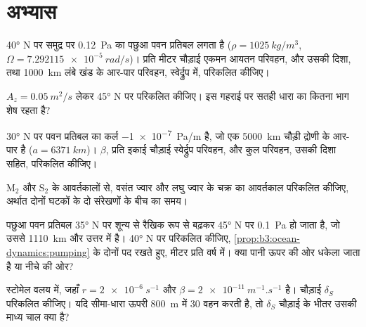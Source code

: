 \section{अभ्यास}

\begin{exercise}[$\star$]\label{exo:b3:ocean-dynamics:1}
\ang{40} N पर समुद्र पर \qty{0.12}{Pa} का पछुआ पवन प्रतिबल लगता है
($\rho = \qty{1025}{kg/m^3}$, $\Omega = \qty{7.292115e-5}{rad/s}$)।
प्रति मीटर चौड़ाई एकमन आयतन परिवहन, और उसकी दिशा,
तथा \qty{1000}{km} लंबे खंड के आर-पार परिवहन, स्वेर्द्रुप में, परिकलित कीजिए।
\end{exercise}

\begin{exercise}[$\star$]\label{exo:b3:ocean-dynamics:2}
$A_z = \qty{0.05}{m^2/s}$ लेकर \ang{45} N पर  परिकलित कीजिए। इस
गहराई पर सतही धारा का कितना भाग शेष रहता है?
\end{exercise}

\begin{exercise}[$\star$]\label{exo:b3:ocean-dynamics:3}
\ang{30} N पर पवन प्रतिबल का कर्ल \qty{-1e-7}{Pa/m} है, जो एक
\qty{5000}{km} चौड़ी द्रोणी के आर-पार है ($a = \qty{6371}{km}$)। $\beta$, प्रति
इकाई चौड़ाई स्वेर्द्रुप परिवहन, और कुल परिवहन, उसकी
दिशा सहित, परिकलित कीजिए।
\end{exercise}

\begin{exercise}[$\star$]\label{exo:b3:ocean-dynamics:4}
M$_2$ और S$_2$ के आवर्तकालों से, वसंत ज्वार और लघु ज्वार के चक्र का
आवर्तकाल परिकलित कीजिए, अर्थात दोनों घटकों के दो संरेखणों के बीच का
समय।
\end{exercise}

\begin{exercise}[$\star\star$]\label{exo:b3:ocean-dynamics:5}
पछुआ पवन प्रतिबल \ang{35} N पर शून्य से रैखिक रूप से बढ़कर
\ang{45} N पर \qty{0.1}{Pa} हो जाता है, जो उससे \qty{1110}{km} और उत्तर में है।
\ang{40} N पर  परिकलित कीजिए, \cref{prop:b3:ocean-dynamics:pumping} के दोनों पद रखते हुए, मीटर प्रति वर्ष में।
क्या पानी ऊपर की ओर धकेला जाता है या नीचे की ओर?
\end{exercise}

\begin{exercise}[$\star\star$]\label{exo:b3:ocean-dynamics:6}
स्टोमेल वलय में, जहाँ $r = \qty{2e-6}{s^{-1}}$ और $\beta =
\qty{2e-11}{m^{-1}.s^{-1}}$ है। चौड़ाई $\delta_S$ परिकलित कीजिए। यदि सीमा-धारा
ऊपरी \qty{800}{m} में \qty{30}{\sverdrup} वहन करती है, तो $\delta_S$ चौड़ाई के भीतर
उसकी माध्य चाल क्या है?
\end{exercise}

